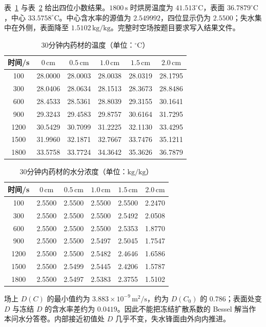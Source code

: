 表~\ref{tab:q1T} 与表~\ref{tab:q1C} 给出四位小数结果。$1800\,\mathrm{s}$ 时烘房温度为 $41.513^\circ\mathrm{C}$，表面 $36.7879^\circ\mathrm{C}$，中心 $33.5758^\circ\mathrm{C}$。中心含水率的源值为 $2.549992$，四位显示仍为 $2.5500$；失水集中在外侧，表面降至 $1.5102\,\mathrm{kg/kg}$。完整时空场按题目要求写入结果文件。

\begin{table}[htbp]
\centering
\caption{30分钟内药材的温度（单位：$^\circ\mathrm{C}$）}
\label{tab:q1T}
\begin{tabular}{cccccc}
\toprule
时间/s & $0\,\mathrm{cm}$ & $0.5\,\mathrm{cm}$ & $1.0\,\mathrm{cm}$ & $1.5\,\mathrm{cm}$ & $2.0\,\mathrm{cm}$ \\
\midrule
100  & 28.0000 & 28.0003 & 28.0038 & 28.0319 & 28.1795 \\
300  & 28.0406 & 28.0634 & 28.1513 & 28.3673 & 28.8486 \\
600  & 28.4533 & 28.5361 & 28.8039 & 29.3155 & 30.1641 \\
900  & 29.3243 & 29.4583 & 29.8757 & 30.6164 & 31.7295 \\
1200 & 30.5429 & 30.7099 & 31.2225 & 32.1130 & 33.4295 \\
1500 & 31.9960 & 32.1871 & 32.7667 & 33.7476 & 35.1211 \\
1800 & 33.5758 & 33.7724 & 34.3642 & 35.3626 & 36.7879 \\
\bottomrule
\end{tabular}
\end{table}

\begin{table}[htbp]
\centering
\caption{30分钟内药材的水分浓度（单位：$\mathrm{kg/kg}$）}
\label{tab:q1C}
\begin{tabular}{cccccc}
\toprule
时间/s & $0\,\mathrm{cm}$ & $0.5\,\mathrm{cm}$ & $1.0\,\mathrm{cm}$ & $1.5\,\mathrm{cm}$ & $2.0\,\mathrm{cm}$ \\
\midrule
100  & 2.5500 & 2.5500 & 2.5500 & 2.5500 & 2.2470 \\
300  & 2.5500 & 2.5500 & 2.5500 & 2.5492 & 2.0508 \\
600  & 2.5500 & 2.5500 & 2.5500 & 2.5353 & 1.8770 \\
900  & 2.5500 & 2.5500 & 2.5497 & 2.5045 & 1.7547 \\
1200 & 2.5500 & 2.5500 & 2.5482 & 2.4646 & 1.6586 \\
1500 & 2.5500 & 2.5499 & 2.5445 & 2.4206 & 1.5787 \\
1800 & 2.5500 & 2.5497 & 2.5383 & 2.3755 & 1.5102 \\
\bottomrule
\end{tabular}
\end{table}

场上 $D(C)$ 的最小值约为 $3.883\times10^{-9}\,\mathrm{m^2/s}$，约为 $D(C_0)$ 的 $0.786$；表面处变 $D$ 与冻结 $D$ 的含水率差约为 $0.0419$。因此不能把冻结扩散系数的 Bessel 解当作本问水分答卷。内部接近初值处 $D$ 几乎不变，失水锋面由外向内推进。
